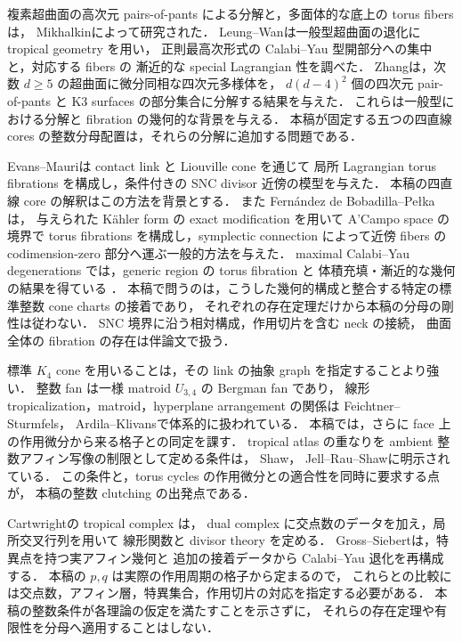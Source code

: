 複素超曲面の高次元 pairs-of-pants による分解と，多面体的な底上の torus fibers は，
Mikhalkin\cite[Theorems~1 and~1$'$]{Mikhalkin}によって研究された．
Leung--Wan\cite{LeungWan}は一般型超曲面の退化に tropical geometry を用い，
正則最高次形式の Calabi--Yau 型開部分への集中と，対応する fibers の
漸近的な special Lagrangian 性を調べた．
Zhang\cite[Theorem~1.1]{Zhang}は，次数 $d\ge5$ の超曲面に微分同相な四次元多様体を，
$d(d-4)^2$ 個の四次元 pair-of-pants と K3 surfaces の部分集合に分解する結果を与えた．
これらは一般型における分解と fibration の幾何的な背景を与える．
本稿が固定する五つの四直線 cores の整数分母配置は，それらの分解に追加する問題である．

Evans--Mauri\cite{EM}は contact link と Liouville cone を通じて
局所 Lagrangian torus fibrations を構成し，条件付きの SNC divisor 近傍の模型を与えた．
本稿の四直線 core の解釈はこの方法を背景とする．
また Fernández de Bobadilla--Pełka\cite[Theorem~6.14]{FernandezBobadillaPelka}は，
与えられた Kähler form の exact modification を用いて A'Campo space の境界で
torus fibrations を構成し，symplectic connection によって近傍 fibers の
codimension-zero 部分へ運ぶ一般的方法を与えた．
maximal Calabi--Yau degenerations では，generic region の torus fibration と
体積充填・漸近的な幾何の結果を得ている
\cite[Theorems~1.1--1.2]{FernandezBobadillaPelka}．
本稿で問うのは，こうした幾何的構成と整合する特定の標準整数 cone charts の接着であり，
それぞれの存在定理だけから本稿の分母の剛性は従わない．
SNC 境界に沿う相対構成，作用切片を含む neck の接続，
曲面全体の fibration の存在は伴論文\cite{SurfaceGeometry}で扱う．

標準 $K_4$ cone を用いることは，その link の抽象 graph を指定することより強い．
整数 fan は一様 matroid $U_{3,4}$ の Bergman fan であり，
線形 tropicalization，matroid，hyperplane arrangement の関係は
Feichtner--Sturmfels\cite{FeichtnerSturmfels}，
Ardila--Klivans\cite{ArdilaKlivans}で体系的に扱われている．
本稿では，さらに face 上の作用微分から来る格子との同定を課す．
tropical atlas の重なりを ambient 整数アフィン写像の制限として定める条件は，
Shaw\cite[Definition~3.1]{ShawSurfaces}，
Jell--Rau--Shaw\cite[Definitions~2.1 and~5.1]{JellRauShaw}に明示されている．
この条件と，torus cycles の作用微分との適合性を同時に要求する点が，
本稿の整数 clutching の出発点である．

Cartwright\cite[Definitions~2.5 and~2.8]{CartwrightComplexes}の tropical complex は，
dual complex に交点数のデータを加え，局所交叉行列を用いて
線形関数と divisor theory を定める．
Gross--Siebert\cite{GrossSiebert}は，特異点を持つ実アフィン幾何と
追加の接着データから Calabi--Yau 退化を再構成する．
本稿の $p,q$ は実際の作用周期の格子から定まるので，
これらとの比較には交点数，アフィン層，特異集合，作用切片の対応を指定する必要がある．
本稿の整数条件が各理論の仮定を満たすことを示さずに，
それらの存在定理や有限性を分母へ適用することはしない．

